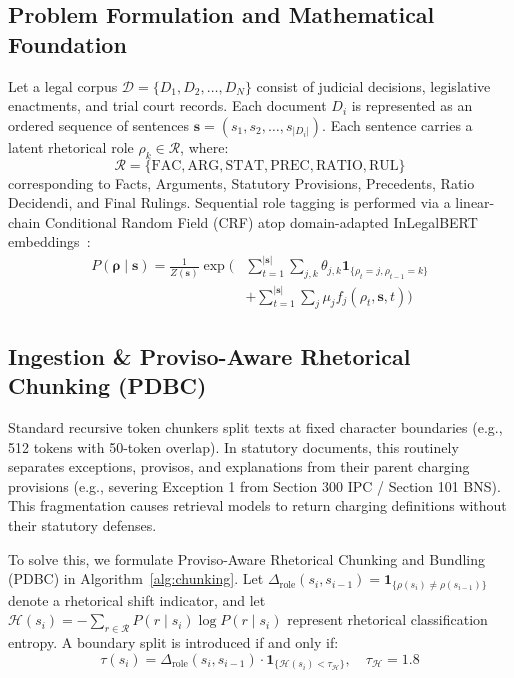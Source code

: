 \documentclass[conference]{IEEEtran}
\begin{document}
\subsection{Problem Formulation and Mathematical Foundation}
Let a legal corpus $\mathcal{D} = \{D_1, D_2, \dots, D_N\}$ consist of judicial decisions, legislative enactments, and trial court records. Each document $D_i$ is represented as an ordered sequence of sentences $\mathbf{s} = (s_1, s_2, \dots, s_{|D_i|})$. Each sentence carries a latent rhetorical role $\rho_k \in \mathcal{R}$, where:
\begin{equation}
\mathcal{R} = \{\text{FAC}, \text{ARG}, \text{STAT}, \text{PREC}, \text{RATIO}, \text{RUL}\}
\end{equation}
corresponding to Facts, Arguments, Statutory Provisions, Precedents, Ratio Decidendi, and Final Rulings. Sequential role tagging is performed via a linear-chain Conditional Random Field (CRF) atop domain-adapted InLegalBERT embeddings~\cite{lafferty2001crf}:
\begin{equation}
\begin{aligned}
P(\mathbf{\rho} \mid \mathbf{s}) = \frac{1}{Z(\mathbf{s})} \exp\Biggl( &\sum_{t=1}^{|\mathbf{s}|} \sum_{j, k} \theta_{j, k} \mathbf{1}_{\{\rho_t = j, \rho_{t-1} = k\}} \\
&+ \sum_{t=1}^{|\mathbf{s}|} \sum_j \mu_j f_j(\rho_t, \mathbf{s}, t) \Biggr)
\end{aligned}
\end{equation}

\subsection{Ingestion \& Proviso-Aware Rhetorical Chunking (PDBC)}
Standard recursive token chunkers split texts at fixed character boundaries (e.g., 512 tokens with 50-token overlap). In statutory documents, this routinely separates exceptions, provisos, and explanations from their parent charging provisions (e.g., severing Exception 1 from Section 300 IPC / Section 101 BNS). This fragmentation causes retrieval models to return charging definitions without their statutory defenses.

To solve this, we formulate Proviso-Aware Rhetorical Chunking and Bundling (PDBC) in Algorithm~\ref{alg:chunking}. Let $\Delta_{\text{role}}(s_i, s_{i-1}) = \mathbf{1}_{\{\rho(s_i) \ne \rho(s_{i-1})\}}$ denote a rhetorical shift indicator, and let $\mathcal{H}(s_i) = -\sum_{r \in \mathcal{R}} P(r \mid s_i) \log P(r \mid s_i)$ represent rhetorical classification entropy. A boundary split is introduced if and only if:
\begin{equation}
\tau(s_i) = \Delta_{\text{role}}(s_i, s_{i-1}) \cdot \mathbf{1}_{\{\mathcal{H}(s_i) < \tau_{\mathcal{H}}\}}, \quad \tau_{\mathcal{H}} = 1.8
\end{equation}
\end{document}
